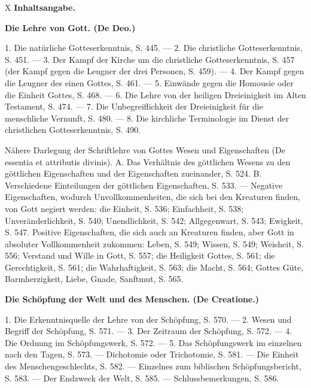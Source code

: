 X \hfill \textbf{Inhaltsangabe.}

\vspace{2em}

\centerline{\textbf{Die Lehre von Gott. (De Deo.)}}

\vspace{1em}

1. Die natürliche Gotteserkenntnis, S. 445. --- 2. Die christliche Gotteserkenntnis, S. 451. --- 3. Der Kampf der Kirche um die christliche Gotteserkenntnis, S. 457 (der Kampf gegen die Leugner der drei Personen, S. 459). --- 4. Der Kampf gegen die Leugner des einen Gottes, S. 461. --- 5. Einwände gegen die Homousie oder die Einheit Gottes, S. 468. --- 6. Die Lehre von der heiligen Dreieinigkeit im Alten Testament, S. 474. --- 7. Die Unbegreiflichkeit der Dreieinigkeit für die menschliche Vernunft, S. 480. --- 8. Die kirchliche Terminologie im Dienst der christlichen Gotteserkenntnis, S. 490.

Nähere Darlegung der Schriftlehre von Gottes Wesen und Eigenschaften (De essentia et attributis divinis). A. Das Verhältnis des göttlichen Wesens zu den göttlichen Eigenschaften und der Eigenschaften zueinander, S. 524. B. Verschiedene Einteilungen der göttlichen Eigenschaften, S. 533. --- Negative Eigenschaften, wodurch Unvollkommenheiten, die sich bei den Kreaturen finden, von Gott negiert werden: die Einheit, S. 536; Einfachheit, S. 538; Unveränderlichkeit, S. 540; Unendlichkeit, S. 542; Allgegenwart, S. 543; Ewigkeit, S. 547. Positive Eigenschaften, die sich auch an Kreaturen finden, aber Gott in absoluter Vollkommenheit zukommen: Leben, S. 549; Wissen, S. 549; Weisheit, S. 556; Verstand und Wille in Gott, S. 557; die Heiligkeit Gottes, S. 561; die Gerechtigkeit, S. 561; die Wahrhaftigkeit, S. 563; die Macht, S. 564; Gottes Güte, Barmherzigkeit, Liebe, Gnade, Sanftmut, S. 565.

\vspace{2em}

\centerline{\textbf{Die Schöpfung der Welt und des Menschen. (De Creatione.)}}

\vspace{1em}

1. Die Erkenntnisquelle der Lehre von der Schöpfung, S. 570. --- 2. Wesen und Begriff der Schöpfung, S. 571. --- 3. Der Zeitraum der Schöpfung, S. 572. --- 4. Die Ordnung im Schöpfungswerk, S. 572. --- 5. Das Schöpfungswerk im einzelnen nach den Tagen, S. 573. --- Dichotomie oder Trichotomie, S. 581. --- Die Einheit des Menschengeschlechts, S. 582. --- Einzelnes zum biblischen Schöpfungsbericht, S. 583. --- Der Endzweck der Welt, S. 585. --- Schlussbemerkungen, S. 586.

